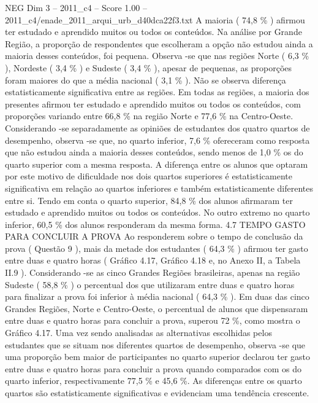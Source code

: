 \begin{textsample}{NEG Dim 3 – 2011\_c4 – Score 1.00 – 2011\_c4/enade\_2011\_arqui\_urb\_d40dca22f3.txt}
A maioria ( 74,8 \% ) afirmou ter estudado e aprendido muitos ou todos os conteúdos.
Na análise por Grande Região, a proporção de respondentes que escolheram a opção não estudou ainda a maioria desses conteúdos, foi pequena.
Observa -se que nas regiões Norte ( 6,3 \% ), Nordeste ( 3,4 \% ) e Sudeste ( 3,4 \% ), apesar de pequenas, as proporções foram maiores do que a média nacional ( 3,1 \% ).
Não se observa diferença estatisticamente significativa entre as regiões.
Em todas as regiões, a maioria dos presentes afirmou ter estudado e aprendido muitos ou todos os conteúdos, com proporções variando entre 66,8 \% na região Norte e 77,6 \% na Centro-Oeste.
Considerando -se separadamente as opiniões de estudantes dos quatro quartos de desempenho, observa -se que, no quarto inferior, 7,6 \% ofereceram como resposta que não estudou ainda a maioria desses conteúdos, sendo menos de 1,0 \% os do quarto superior com a mesma resposta.
A diferença entre os alunos que optaram por este motivo de dificuldade nos dois quartos superiores é estatisticamente significativa em relação ao quartos inferiores e também estatisticamente diferentes entre si.
Tendo em conta o quarto superior, 84,8 \% dos alunos afirmaram ter estudado e aprendido muitos ou todos os conteúdos.
No outro extremo no quarto inferior, 60,5 \% dos alunos responderam da mesma forma. 4.7 TEMPO GASTO PARA CONCLUIR A PROVA Ao responderem sobre o tempo de conclusão da prova ( Questão 9 ), mais da metade dos estudantes ( 64,3 \% ) afirmou ter gasto entre duas e quatro horas ( Gráfico 4.17, Gráfico 4.18 e, no Anexo II, a Tabela II.9 ).
Considerando -se as cinco Grandes Regiões brasileiras, apenas na região Sudeste ( 58,8 \% ) o percentual dos que utilizaram entre duas e quatro horas para finalizar a prova foi inferior à média nacional ( 64,3 \% ).
Em duas das cinco Grandes Regiões, Norte e Centro-Oeste, o percentual de alunos que dispensaram entre duas e quatro horas para concluir a prova, superou 72 \%, como mostra o Gráfico 4.17.
Uma vez sendo analisadas as alternativas escolhidas pelos estudantes que se situam nos diferentes quartos de desempenho, observa -se que uma proporção bem maior de participantes no quarto superior declarou ter gasto entre duas e quatro horas para concluir a prova quando comparados com os do quarto inferior, respectivamente 77,5 \% e 45,6 \%.
As diferenças entre os quarto quartos são estatisticamente significativas e evidenciam uma tendência crescente.

\end{textsample}
